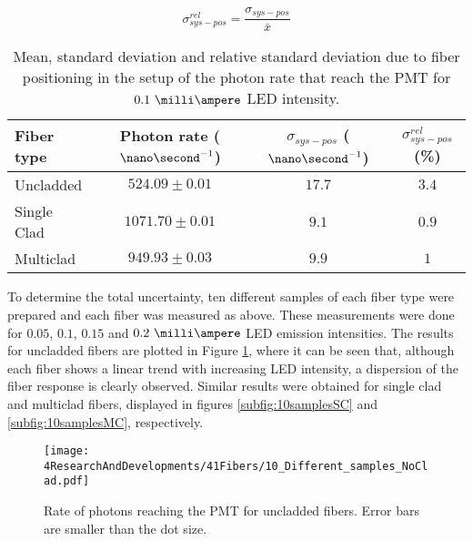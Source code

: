 \begin{equation}
\sigma^{rel}_{sys-pos} = \frac{\sigma_{sys-pos}}{\bar{x}}
\label{eq:RelativeStandardDesviation}
\end{equation}

\begin{table}[htbp]
\centering{}%
\begin{tabular}{lccc}
\toprule 
Fiber type & Photon rate ($\nano\second^{-1}$) & $\sigma_{sys-pos}$ ($\nano\second^{-1}$) & $\sigma^{rel}_{sys-pos}$ (\%) \tabularnewline
\midrule
\midrule 
Uncladded & $524.09 \pm 0.01$ & $17.7$ & $3.4$ \tabularnewline
Single Clad & $1071.70 \pm 0.01$ & $9.1$ & $0.9$ \tabularnewline
Multiclad & $949.93 \pm 0.03$ & $9.9$ & $1$ \tabularnewline
\bottomrule
\end{tabular}
\caption{Mean, standard deviation and relative standard deviation due to fiber positioning in the setup of the photon rate that reach the PMT for $0.1~\milli\ampere$ LED intensity.}
\label{tab:PositionStandardDeviation}
\end{table}



To determine the total uncertainty, ten different samples of each fiber type were prepared and each fiber was measured as above. These measurements were done for $0.05$, $0.1$, $0.15$ and $0.2~\milli\ampere$ LED emission intensities. The results for uncladded fibers are plotted in Figure \ref{fig:10samplesNC}, where it can be seen that, although each fiber shows a linear trend with increasing LED intensity, a dispersion of the fiber response is clearly observed. Similar results were obtained for single clad and multiclad fibers, displayed in figures \ref{subfig:10samplesSC} and \ref{subfig:10samplesMC}, respectively.

\begin{figure}[h]
\centering
\texttt{[image: 4ResearchAndDevelopments/41Fibers/10\_Different\_samples\_NoClad.pdf]}
\caption{Rate of photons reaching the PMT for uncladded fibers. Error bars are smaller than the dot size.\label{fig:10samplesNC}}
\end{figure}

